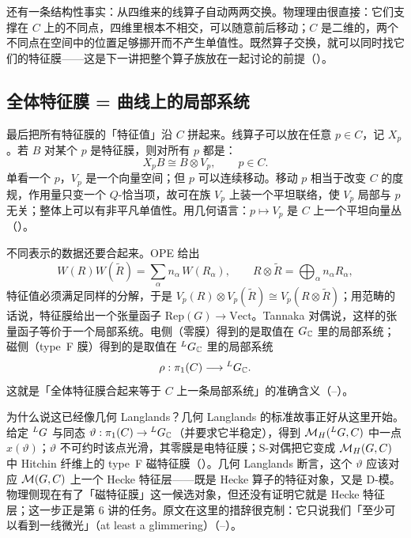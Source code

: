 还有一条结构性事实：从四维来的线算子自动两两交换。物理理由很直接：它们支撑在 $C$ 上的不同点，四维里根本不相交，可以随意前后移动；$C$ 是二维的，两个不同点在空间中的位置足够挪开而不产生单值性。既然算子交换，就可以同时找它们的特征膜——这是下一讲把整个算子族放在一起讨论的前提（）。

\subsection{全体特征膜 = 曲线上的局部系统}

最后把所有特征膜的「特征值」沿 $C$ 拼起来。线算子可以放在任意 $p\in C$，记 $X_p$。若 $B$ 对某个 $p$ 是特征膜，则对所有 $p$ 都是：
\begin{equation}
X_pB\cong B\otimes V_p,\qquad p\in C .
\label{eq:family}
\end{equation}
单看一个 $p$，$V_p$ 是一个向量空间；但 $p$ 可以连续移动。移动 $p$ 相当于改变 $C$ 的度规，作用量只变一个 $Q$-恰当项，故可在族 $V_p$ 上装一个平坦联络，使 $V_p$ 局部与 $p$ 无关；整体上可以有非平凡单值性。用几何语言：$p\mapsto V_p$ 是 $C$ 上一个平坦向量丛（）。

不同表示的数据还要合起来。OPE 给出
\begin{equation}
W(R)W(\tilde R)=\sum_\alpha n_\alpha\,W(R_\alpha),\qquad R\otimes\tilde R=\bigoplus_\alpha n_\alpha R_\alpha,
\label{eq:wilson-ope}
\end{equation}
特征值必须满足同样的分解，于是 $V_p(R)\otimes V_p(\tilde R)\cong V_p(R\otimes\tilde R)$；用范畴的话说，特征膜给出一个张量函子 $\mathrm{Rep}(G)\to\mathrm{Vect}$。Tannaka 对偶说，这样的张量函子等价于一个局部系统。电侧（零膜）得到的是取值在 $G_{\mathbb{C}}$ 里的局部系统；磁侧（type~F 膜）得到的是取值在 ${}^{L}G_{\mathbb{C}}$ 里的局部系统
\begin{equation}
\rho:\pi_1(C)\longrightarrow {}^{L}G_{\mathbb{C}} .
\label{eq:local-system}
\end{equation}
这就是「全体特征膜合起来等于 $C$ 上一条局部系统」的准确含义（--）。

为什么说这已经像几何 Langlands？几何 Langlands 的标准故事正好从这里开始。给定 ${}^{L}G$ 与同态 $\vartheta:\pi_1(C)\to{}^{L}G_{\mathbb{C}}$（并要求它半稳定），得到 $\mathcal{M}_{H}({}^{L}G,C)$ 中一点 $x(\vartheta)$；$\vartheta$ 不可约时该点光滑，其零膜是电特征膜；S-对偶把它变成 $\mathcal{M}_{H}(G,C)$ 中 Hitchin 纤维上的 type~F 磁特征膜（）。几何 Langlands 断言，这个 $\vartheta$ 应该对应 $\mathcal{M}(G,C)$ 上一个 Hecke 特征层——既是 Hecke 算子的特征对象，又是 D-模。物理侧现在有了「磁特征膜」这一候选对象，但还没有证明它就是 Hecke 特征层；这一步正是第 6 讲的任务。原文在这里的措辞很克制：它只说我们「至少可以看到一线微光」（at least a glimmering）（--）。


